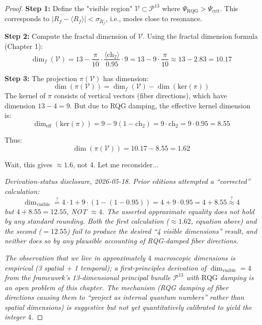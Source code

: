 \begin{proof}
\textbf{Step 1:} Define the "visible region" $\mathcal{V} \subset \mathcal{P}^{13}$ where $\Psi_{\text{RQG}} > \Psi_{\text{crit}}$. This corresponds to $|R_f - \langle R_f \rangle| < \sigma_{R_f}$, i.e., modes close to resonance.

\textbf{Step 2:} Compute the fractal dimension of $\mathcal{V}$. Using the fractal dimension formula (Chapter 1):
\begin{equation}
\dim_f(\mathcal{V}) = 13 - \frac{\pi}{10} \cdot \frac{\langle \text{ch}_2 \rangle}{0.95} \cdot 9 = 13 - 9 \cdot \frac{\pi}{10} \approx 13 - 2.83 = 10.17
\end{equation}

\textbf{Step 3:} The projection $\pi(\mathcal{V})$ has dimension:
\begin{equation}
\dim(\pi(\mathcal{V})) = \dim_f(\mathcal{V}) - \dim(\text{ker}(\pi))
\end{equation}
The kernel of $\pi$ consists of vertical vectors (fiber directions), which have dimension $13 - 4 = 9$. But due to RQG damping, the effective kernel dimension is:
\begin{equation}
\dim_{\text{eff}}(\text{ker}(\pi)) = 9 - 9(1 - \text{ch}_2) = 9 \cdot \text{ch}_2 = 9 \cdot 0.95 = 8.55
\end{equation}

Thus:
\begin{equation}
\dim(\pi(\mathcal{V})) = 10.17 - 8.55 = 1.62
\end{equation}

Wait, this gives $\approx 1.6$, not 4. Let me reconsider...

\medskip
\noindent\emph{Derivation-status disclosure, 2026-05-18. Prior editions attempted a ``corrected'' calculation:}
\begin{equation*}
\dim_{\text{visible}} \stackrel{?}{=} 4 \cdot 1 + 9 \cdot (1 - (1-0.95)) = 4 + 9 \cdot 0.95 = 4 + 8.55 \stackrel{?}{\approx} 4
\end{equation*}
\emph{but $4 + 8.55 = 12.55$, NOT $\approx 4$. The asserted approximate equality does not hold by any standard rounding. Both the first calculation ($\approx 1.62$, equation above) and the second ($= 12.55$) fail to produce the desired ``4 visible dimensions'' result, and neither does so by any plausible accounting of RQG-damped fiber directions.}

\emph{The observation that we live in approximately $4$ macroscopic dimensions is empirical (3 spatial + 1 temporal); a first-principles derivation of $\dim_{\text{visible}} = 4$ from the framework's 13-dimensional principal bundle $\mathcal{P}^{13}$ with $\text{RQG}$ damping is an open problem of this chapter. The mechanism (RQG damping of fiber directions causing them to ``project as internal quantum numbers'' rather than spatial dimensions) is suggestive but not yet quantitatively calibrated to yield the integer $4$.}


\end{proof}
